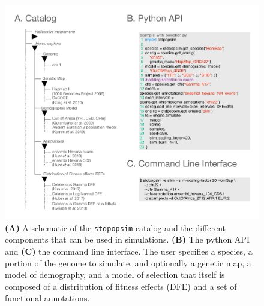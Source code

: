 \documentclass[hidelinks]{article}
\newcommand{\stdpopsim}{\texttt{stdpopsim}\xspace}
\begin{document}
    \begin{figure}[t!]
        \includegraphics[width=\linewidth]{figures/schematics/catalog.pdf}
        \caption{\label{fig:schematic}
        \textbf{(A)} A schematic of the \stdpopsim catalog and the different components that
        can be used in simulations. 
        \textbf{(B)} The python API and \textbf{(C)} the command line interface.
        The user specifies a species, a portion of
        the genome to simulate, and optionally a genetic map, a model of
        demography, and a model of selection that itself is composed of a
        distribution of fitness effects (DFE) and a set of functional
        annotations. }
    \end{figure}
    
\end{document}
